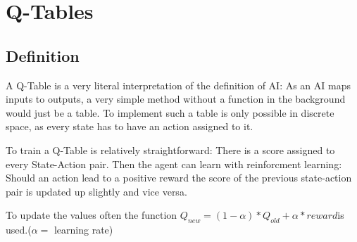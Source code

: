\section{Q-Tables}
\label{sec:QTable}
\subsection{Definition}
A Q-Table is a very literal interpretation of the definition of AI: As an AI maps inputs to outputs, a very simple method without a function in the background would just be a table. To implement such a table is only possible in discrete space, as every state has to have an action assigned to it.

To train a Q-Table is relatively straightforward: There is a score assigned to every State-Action pair. Then the agent can learn with reinforcment learning: Should an action lead to a positive reward the score of the previous state-action pair is updated up slightly and vice versa.

To update the values often the function $Q_{new}=(1-\alpha)*Q_{old}+\alpha*reward$is used.($\alpha=$ learning rate)
